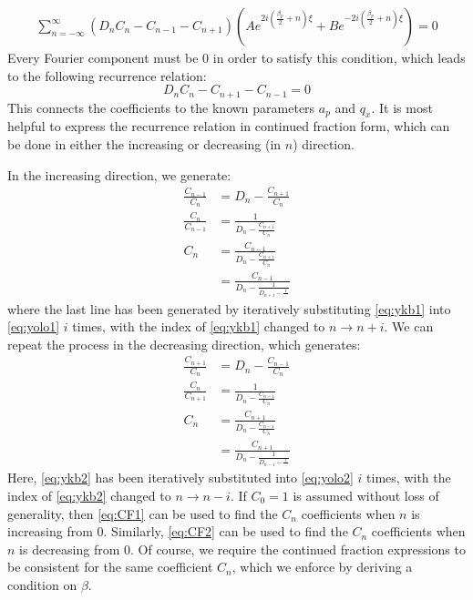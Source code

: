 \documentclass{article}
\begin{document}
\begin{gather*}
	\sum_{n = - \infty}^{\infty} (D_{n} C_{n} - C_{n - 1} - C_{n + 1}) (A e^{2i (\frac{\beta_p}{2} + n) \xi} + B e^{-2i (\frac{\beta_p}{2} + n) \xi} ) = 0
\end{gather*}
Every Fourier component must be 0 in order to satisfy this condition, which leads to the following recurrence relation:
\begin{equation}
	D_{n} C_{n} - C_{n + 1} - C_{n - 1} = 0
\label{eq:phoebe}
\end{equation}
This connects the coefficients to the known parameters $a_p$ and $q_x$. It is most helpful to express the recurrence relation in continued fraction form, which can be done in either the increasing or decreasing (in $n$) direction.\par
\medskip
\noindent In the increasing direction, we generate:
\begin{align}
	\frac{C_{n-1}}{C_{n}} & = D_{n} - \frac{C_{n + 1}}{C_{n}} \nonumber \\
	\frac{C_{n}}{C_{n - 1}} & = \frac{1}{D_{n} - \frac{C_{n + 1}}{C_{n}}} \label{eq:ykb1} \\
	C_{n} & = \frac{C_{n - 1}}{D_{n} - \frac{C_{n + 1}}{C_{n}}} \label{eq:yolo1} \\
	& = \frac{C_{n - 1}}{D_{n} - \frac{1}{D_{n+1} - \frac{1}{\dots}}} \label{eq:CF1}
\end{align}
where the last line has been generated by iteratively substituting \eqref{eq:ykb1} into \eqref{eq:yolo1} $i$ times, with the index of \eqref{eq:ykb1} changed to $n \rightarrow n + i$. We can repeat the process in the decreasing direction, which generates:
\begin{align}
\frac{C_{n + 1}}{C_{n}} & = D_{n} - \frac{C_{n - 1}}{C_{n}}	 \nonumber \\
\frac{C_{n}}{C_{n + 1}} & = \frac{1}{D_{n} - \frac{C_{n - 1}}{C_{n}}} \label{eq:ykb2} \\
C_{n} & = \frac{C_{n + 1}}{D_{n} - \frac{C_{n - 1}}{C_{n}}} \label{eq:yolo2} \\
& = \frac{C_{n + 1}}{D_{n} - \frac{1}{D_{n-1} - \frac{1}{\dots}}} \label{eq:CF2}
\end{align}
Here, \eqref{eq:ykb2} has been iteratively substituted into \eqref{eq:yolo2} $i$ times, with the index of \eqref{eq:ykb2} changed to $n \rightarrow n - i$. If $C_{0} = 1$ is assumed without loss of generality, then \eqref{eq:CF1} can be used to find the $C_{n}$ coefficients when $n$ is increasing from 0. Similarly, \eqref{eq:CF2} can be used to find the $C_{n}$ coefficients when $n$ is decreasing from 0. Of course, we require the continued fraction expressions to be consistent for the same coefficient $C_{n}$, which we enforce by deriving a condition on $\beta$. \par
\end{document}
